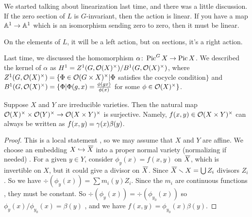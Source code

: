 
We started talking about linearization last time, and there was a little discussion. If the zero section of $L$ is $G$-invariant, then the action is linear. If you have a map $\AA^1\to \AA^1$ which is an isomorphism sending zero to zero, then it must be linear.

On the elements of $L$, it will be a left action, but on sections, it's a right action.

Last time, we discussed the homomorphism $\alpha\colon \pic^G X\to \pic X$. We described the kernel of $\alpha$ as $H^1=Z^1(G,\O(X)^\times)/B^1(G,\O(X)^\times)$, where $Z^1(G,\O(X)^\times) = \{\Phi\in \O(G\times X)^\times|\Phi$ satisfies the cocycle condition$\}$ and $B^1(G,\O(X)^\times)=\{\Phi| \Phi(g,x)=\frac{\phi(gx)}{\phi(x)}$ for some $\phi\in \O(X)^\times\}$.
\begin{theorem}[Rosenlicht]
 Suppose $X$ and $Y$ are irreducible varieties. Then the natural map $\O(X)^\times\times \O(Y)^\times \to \O(X\times Y)^\times$ is surjective. Namely, $f(x,y)\in \O(X\times Y)^\times$ can always be written as $f(x,y)=\ga(x)\beta(y)$.
\end{theorem}
\begin{proof}
 This is a local statement , so we may assume that $X$ and $Y$ are affine. We choose an embedding $X\hookrightarrow \bbar X$ into a proper normal variety (normalizing if needed) . For a given $y\in Y$, consider $\phi_y(x)=f(x,y)$ on $\bbar X$, which is invertible on $X$, but it could give a divisor on $\bbar X$. Since $\bbar X\setminus X = \bigcup Z_i$ divisors $Z_i$ . So we have $\div(\phi_y(x))=\sum m_i(y)Z_i$. Since the $m_i$ are continuous functions , they must be constant. So $\div(\phi_y(x))=\div(\phi_{y_0}(x))$ so $\phi_y(x)/\phi_{y_0}(x)=\beta(y)$ , and we have $f(x,y)=\phi_{y_0}(x)\beta(y)$.
 
 
\end{proof}
